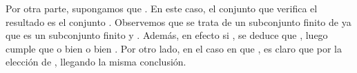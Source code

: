 \begin{isabellebody}
\begin{isamarkuptext}
\begin{demostracion}
    Por otra parte, supongamos que . En este caso, el conjunto  que verifica el
    resultado es el conjunto . Observemos que se trata de un subconjunto finito de  ya 
    que  es un subconjunto finito y . Además, en efecto si , se deduce 
    que , luego cumple que o bien  o bien
    . Por otro lado, en el caso en que , es claro que  por
    la elección de , llegando la misma conclusión.
  \end{demostracion}


\end{isamarkuptext}
\end{isabellebody}
